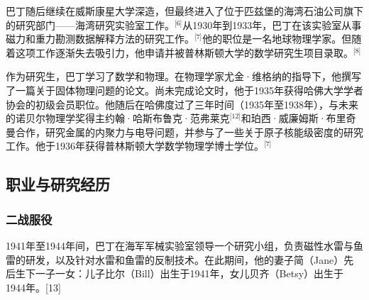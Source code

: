 巴丁随后继续在威斯康星大学深造，但最终进入了位于匹兹堡的海湾石油公司旗下的研究部门——海湾研究实验室工作。\(^\text{[6]}\)从1930年到1933年，巴丁在该实验室从事磁力和重力勘测数据解释方法的研究工作。\(^\text{[7]}\)他的职位是一名地球物理学家。但随着这项工作逐渐失去吸引力，他申请并被普林斯顿大学的数学研究生项目录取。\(^\text{[8]}\)

作为研究生，巴丁学习了数学和物理。在物理学家尤金·维格纳的指导下，他撰写了一篇关于固体物理问题的论文。尚未完成论文时，他于1935年获得哈佛大学学者协会的初级会员职位。他随后在哈佛度过了三年时间（1935年至1938年），与未来的诺贝尔物理学奖得主约翰·哈斯布鲁克·范弗莱克\(^\text{[12]}\)和珀西·威廉姆斯·布里奇曼合作，研究金属的内聚力与电导问题，并参与了一些关于原子核能级密度的研究工作。他于1936年获得普林斯顿大学数学物理学博士学位。\(^\text{[7]}\)
\subsection{职业与研究经历}
\subsubsection{二战服役}
1941年至1944年间，巴丁在海军军械实验室领导一个研究小组，负责磁性水雷与鱼雷的研发，以及针对水雷和鱼雷的反制技术。在此期间，他的妻子简（Jane）先后生下一子一女：儿子比尔（Bill）出生于1941年，女儿贝齐（Betsy）出生于1944年。[13]
